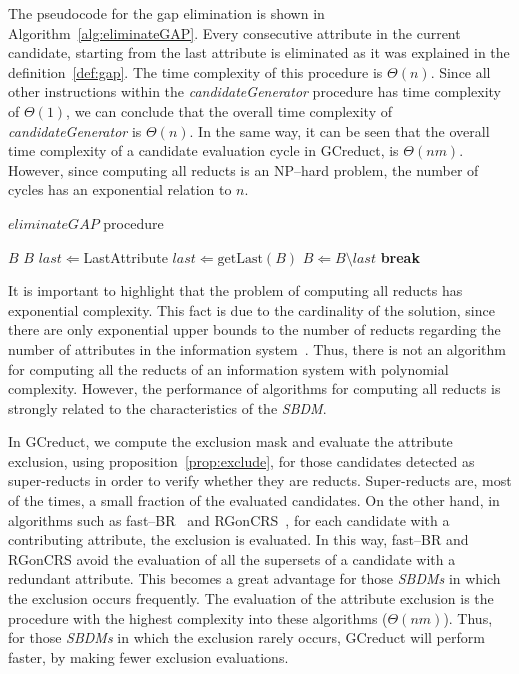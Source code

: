 \documentclass[number,preprint,review,12pt]{elsarticle}
\begin{document}
	The pseudocode for the gap elimination is shown in Algorithm~\ref{alg:eliminateGAP}. Every consecutive attribute in the current candidate, starting from the last attribute is eliminated as it was explained in the definition~\ref{def:gap}. The time complexity of this procedure is $\Theta(n)$. Since all other instructions within the \textit{candidateGenerator} procedure has time complexity of $\Theta(1)$, we can conclude that the overall time complexity of \textit{candidateGenerator} is $\Theta(n)$. In the same way, it can be seen that the overall time complexity of a candidate evaluation cycle in GCreduct, is $\Theta(nm)$. However, since computing all reducts is an NP--hard problem, the number of cycles has an exponential relation to $n$.

	\begin{algorithm}
		\footnotesize
		\caption{$eliminateGAP$ procedure}
		\label{alg:eliminateGAP}
		\begin{algorithmic}[1]	
			\Require \textit{$B$}
			\Ensure $B$ 
			\State $last \Leftarrow $LastAttribute
			\State $last \Leftarrow \mathrm{getLast}(B)$
			\State $B \Leftarrow B\setminus last$
			\State \textbf{break}\label{line:gapEnd}
			\EndIf
			\EndWhile
		\end{algorithmic}
	\end{algorithm}
		
	It is important to highlight that the problem of computing all reducts has exponential complexity. This fact is due to the cardinality of the solution, since there are only exponential upper bounds to the number of reducts regarding the number of attributes in the information system~\cite{Skowron92}. Thus, there is not an algorithm for computing all the reducts of an information system with polynomial complexity. However, the performance of algorithms for computing all reducts is strongly related to the characteristics of the \textit{SBDM}. 
	
	\label{par:complexity}
	In GCreduct, we compute the exclusion mask and evaluate the attribute exclusion, using proposition~\ref{prop:exclude}, for those candidates detected as super-reducts in order to verify whether they are reducts. Super-reducts are, most of the times, a small fraction of the evaluated candidates. On the other hand, in algorithms such as fast--BR~\cite{Lias13} and RGonCRS~\cite{WangP07}, for each candidate with a contributing attribute, the exclusion is evaluated. In this way, fast--BR and RGonCRS avoid the evaluation of all the supersets of a candidate with a redundant attribute. This becomes a great advantage for those \textit{SBDMs} in which the exclusion occurs frequently. The evaluation of the attribute exclusion is the procedure with the highest complexity into these algorithms ($\Theta (nm)$). Thus, for those \textit{SBDMs} in which the exclusion rarely occurs, GCreduct will perform faster, by making fewer exclusion evaluations.
	
\end{document}
